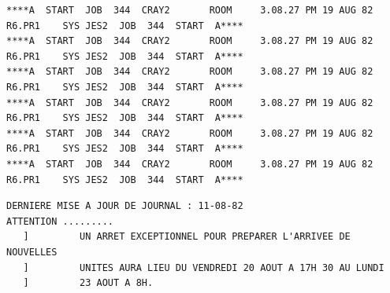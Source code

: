 \handwritten{\[
\begin{aligned}
&m\subset\underset p{\underbrace{P/2P}}\times\underset q{\underbrace{Q/2Q}}\\
&\hspace{4em}\text{sous-module}\\
&\hspace{6em}\text{de }k/2k\text{-module}\\
&m\cap p=0\qquad m\to p\ \text{injectif}\\
&m\cap q=0\qquad m\to q\ \text{injectif}
\end{aligned}
\]}

{\tiny
\begin{verbatim}
****A  START  JOB  344  CRAY2       ROOM     3.08.27 PM 19 AUG 82  R6.PR1    SYS JES2  JOB  344  START  A****
****A  START  JOB  344  CRAY2       ROOM     3.08.27 PM 19 AUG 82  R6.PR1    SYS JES2  JOB  344  START  A****
****A  START  JOB  344  CRAY2       ROOM     3.08.27 PM 19 AUG 82  R6.PR1    SYS JES2  JOB  344  START  A****
****A  START  JOB  344  CRAY2       ROOM     3.08.27 PM 19 AUG 82  R6.PR1    SYS JES2  JOB  344  START  A****
****A  START  JOB  344  CRAY2       ROOM     3.08.27 PM 19 AUG 82  R6.PR1    SYS JES2  JOB  344  START  A****
****A  START  JOB  344  CRAY2       ROOM     3.08.27 PM 19 AUG 82  R6.PR1    SYS JES2  JOB  344  START  A****
\end{verbatim}
}

{\scriptsize
\begin{verbatim}
DERNIERE MISE A JOUR DE JOURNAL : 11-08-82
ATTENTION .........
   ]         UN ARRET EXCEPTIONNEL POUR PREPARER L'ARRIVEE DE NOUVELLES
   ]         UNITES AURA LIEU DU VENDREDI 20 AOUT A 17H 30 AU LUNDI
   ]         23 AOUT A 8H.
\end{verbatim}
}

\handwritten{$x\mapsto 2x:M\to M$ injectif. \deleted{$k[\frac12$} \uline{$M$ plat sur $k$} donc $x\mapsto 2x$ $M\to M$ injectif}

\handwritten{\deleted{\[
\begin{aligned}
&\deleted{\unsure{k'=k\hookrightarrow}}\ k'=k[\tfrac12]\\
&M\subset M\otimes k'=M'=M'_+\oplus M'_-=\deleted{M_+ k'}\\
&M_+=\{m\in M\mid\sigma x=\unsure{x|+}\}=\operatorname{Ker}(1-\sigma)\\
&M_-=\{m\in M\mid\sigma x=-x\}=\operatorname{Ker}(1+\sigma)
\end{aligned}
\]}}

\handwritten{\[
\begin{aligned}M_+\cap M_-&=0\\
M/M_++M_-&\quad\text{annulé par }2\\
2x&=(\underbrace{x+\sigma x}_{\in M_+})+(\underbrace{m-\sigma x}_{\in M_-})
\end{aligned}
\]}

